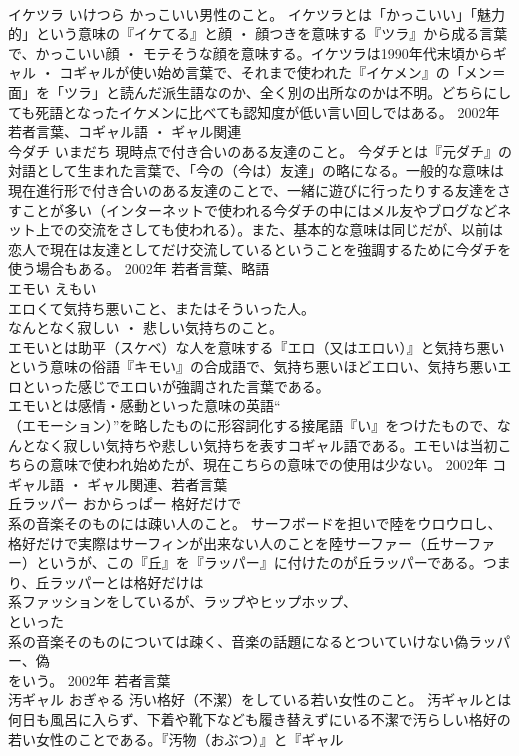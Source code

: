 \documentclass[8pt]{extreport}
\begin{document}
\begin{CJK}{UTF8}{min}
\\	イケツラ	いけつら	かっこいい男性のこと。	イケツラとは「かっこいい」「魅力的」という意味の『イケてる』と顔 ・ 顔つきを意味する『ツラ』から成る言葉で、かっこいい顔 ・ モテそうな顔を意味する。イケツラは1990年代末頃からギャル ・ コギャルが使い始め言葉で、それまで使われた『イケメン』の「メン＝面」を「ツラ」と読んだ派生語なのか、全く別の出所なのかは不明。どちらにしても死語となったイケメンに比べても認知度が低い言い回しではある。	2002年	若者言葉、コギャル語 ・ ギャル関連	
\\	今ダチ	いまだち	現時点で付き合いのある友達のこと。	今ダチとは『元ダチ』の対語として生まれた言葉で、「今の（今は）友達」の略になる。一般的な意味は現在進行形で付き合いのある友達のことで、一緒に遊びに行ったりする友達をさすことが多い（インターネットで使われる今ダチの中にはメル友やブログなどネット上での交流をさしても使われる）。また、基本的な意味は同じだが、以前は恋人で現在は友達としてだけ交流しているということを強調するために今ダチを使う場合もある。	2002年	若者言葉、略語	
\\	エモい	えもい	
\\	エロくて気持ち悪いこと、またはそういった人。 
\\	なんとなく寂しい ・ 悲しい気持ちのこと。	
\\	エモいとは助平（スケベ）な人を意味する『エロ（又はエロい）』と気持ち悪いという意味の俗語『キモい』の合成語で、気持ち悪いほどエロい、気持ち悪いエロといった感じでエロいが強調された言葉である。 
\\	エモいとは感情・感動といった意味の英語“
\\	（エモーション）”を略したものに形容詞化する接尾語『い』をつけたもので、なんとなく寂しい気持ちや悲しい気持ちを表すコギャル語である。エモいは当初こちらの意味で使われ始めたが、現在こちらの意味での使用は少ない。	2002年	コギャル語 ・ ギャル関連、若者言葉	
\\	丘ラッパー	おからっぱー	格好だけで
\\	系の音楽そのものには疎い人のこと。	サーフボードを担いで陸をウロウロし、格好だけで実際はサーフィンが出来ない人のことを陸サーファー（丘サーファー）というが、この『丘』を『ラッパー』に付けたのが丘ラッパーである。つまり、丘ラッパーとは格好だけは
\\	系ファッションをしているが、ラップやヒップホップ、
\\	といった
\\	系の音楽そのものについては疎く、音楽の話題になるとついていけない偽ラッパー、偽
\\	をいう。	2002年	若者言葉	
\\	汚ギャル	おぎゃる	汚い格好（不潔）をしている若い女性のこと。	汚ギャルとは何日も風呂に入らず、下着や靴下なども履き替えずにいる不潔で汚らしい格好の若い女性のことである。『汚物（おぶつ）』と『ギャル

\end{CJK}
\end{document}
